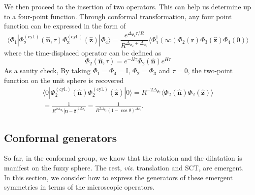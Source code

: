 \documentclass{timesjhep}
\begin{document}
We then proceed to the insertion of two operators. This can help us determine up to a four-point function. Through conformal transformation, any four point function can be expressed in the form of 
\begin{equation}
    \langle\Phi_1|\Phi^{\mathrm{(cyl.)}}_2(\hat{\mathbf{n}},\tau)\Phi^{\mathrm{(cyl.)}}_3(\hat{\mathbf{z}})|\Phi_4\rangle=\frac{e^{\Delta_{\Phi_2}\tau/R}}{R^{\Delta_{\Phi_2}+\Delta_{\Phi_3}}}\langle\Phi_1^\dagger(\infty)\Phi_2(\mathbf{r})\Phi_3(\hat{\mathbf{z}})\Phi_4(0)\rangle
\end{equation} where the time-displaced operator can be defined as
\begin{equation}
    \Phi_2(\hat{\mathbf{n}},\tau)=e^{-H\tau}\Phi_2(\hat{\mathbf{n}})e^{H\tau}
\end{equation} As a sanity check, By taking $\Phi_1=\Phi_4=\mathbb{I}$, $\Phi_2=\Phi_3$ and $\tau=0$, the two-point function on the unit sphere is recovered 
\begin{multline}
    \langle0|\Phi^{\mathrm{(cyl.)}}_2(\hat{\mathbf{n}})\Phi^{\mathrm{(cyl.)}}_2(\hat{\mathbf{z}})|0\rangle=R^{-2\Delta_{\Phi_2}}\langle\Phi_2(\hat{\mathbf{n}})\Phi_2(\hat{\mathbf{z}})\rangle\\=\frac{1}{R^{2\Delta_{\Phi_2}}|\hat{\mathbf{n}}-\hat{\mathbf{z}}|^{2\Delta_{\Phi_2}}}=\frac{1}{R^{2\Delta_{\Phi_2}}(1-\cos\theta)^{\Delta_{\Phi_2}}}.
\end{multline}

\subsection{Conformal generators}
\label{sec:construct_gen}

So far, in the conformal group, we know that the rotation and the dilatation is manifest on the fuzzy sphere. The rest, \textit{viz.} translation and SCT, are emergent. In this section, we consider how to express the generators of these emergent symmetries in terms of the microscopic operators. 
\end{document}
